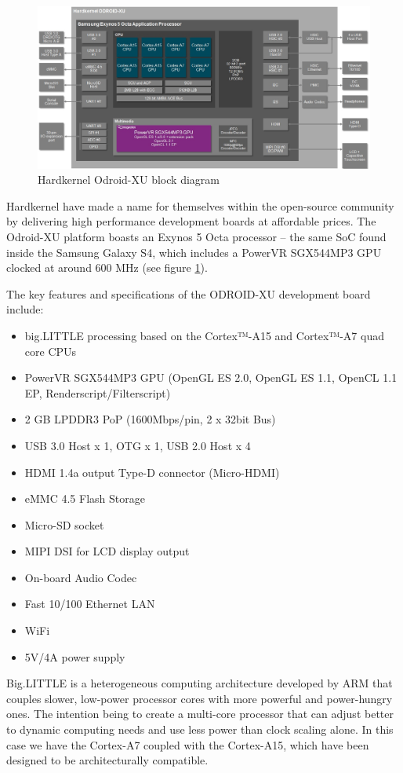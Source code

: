 \begin{figure}[t!]
\centering
\includegraphics[width=0.9\linewidth]{Figures/Hardkernel-ODROID-XU-block_diagram.jpg}
\caption{Hardkernel Odroid-XU block diagram}
\label{odroid-xu}
\end{figure}

Hardkernel have made a name for themselves within the open-source community by delivering high performance development boards at affordable prices. The Odroid-XU platform boasts an Exynos 5 Octa processor – the same SoC found inside the Samsung Galaxy S4, which includes a PowerVR SGX544MP3 GPU clocked at around 600 MHz (see figure \ref{odroid-xu}).

The key features and specifications of the ODROID-XU development board include:
\begin{itemize}
\item big.LITTLE processing based on the Cortex™-A15 and Cortex™-A7 quad core CPUs
\item PowerVR SGX544MP3 GPU (OpenGL ES 2.0, OpenGL ES 1.1, OpenCL 1.1 EP, Renderscript/Filterscript)
\item 2 GB LPDDR3 PoP (1600Mbps/pin, 2 x 32bit Bus)
\item USB 3.0 Host x 1, OTG x 1, USB 2.0 Host x 4
\item HDMI 1.4a output Type-D connector (Micro-HDMI)
\item eMMC 4.5 Flash Storage
\item Micro-SD socket
\item MIPI DSI for LCD display output
\item On-board Audio Codec
\item Fast 10/100 Ethernet LAN
\item WiFi
\item 5V/4A power supply
\end{itemize}

Big.LITTLE is a heterogeneous computing architecture developed by ARM that couples slower, low-power processor cores with more powerful and power-hungry ones. The intention being to create a multi-core processor that can adjust better to dynamic computing needs and use less power than clock scaling alone. In this case we have the Cortex-A7 coupled with the Cortex-A15, which have been designed to be architecturally compatible.

